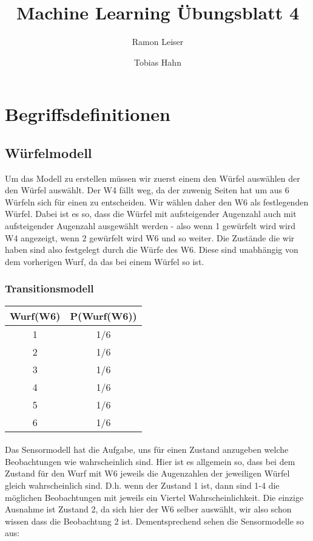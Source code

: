 \documentclass[a4paper]{article}
\title{Machine Learning Übungsblatt 4}
\author{Ramon Leiser\and Tobias Hahn}
\begin{document}
\maketitle
\newpage
\section{Begriffsdefinitionen}

\subsection{Würfelmodell}
Um das Modell zu erstellen müssen wir zuerst einem den Würfel auswählen der den Würfel auswählt. Der W4 fällt weg, da der zuwenig Seiten hat um aus 6 Würfeln sich für einen zu entscheiden. Wir wählen daher den W6 als festlegenden Würfel. Dabei ist es so, dass die Würfel mit aufsteigender Augenzahl auch mit aufsteigender Augenzahl ausgewählt werden - also wenn 1 gewürfelt wird wird W4 angezeigt, wenn 2 gewürfelt wird W6 und so weiter. Die Zustände die wir haben sind also festgelegt durch die Würfe des W6. Diese sind unabhängig von dem vorherigen Wurf, da das bei einem Würfel so ist.

\subsubsection{Transitionsmodell}
\begin{tabular}{|c|c|}
\hline
Wurf(W6) & P(Wurf(W6)) \\\hline
1 & 1/6 \\
2 & 1/6 \\
3 & 1/6 \\
4 & 1/6 \\
5 & 1/6 \\
6 & 1/6 \\\hline
\end{tabular}

\paragraph{}
Das Sensormodell hat die Aufgabe, uns für einen Zustand anzugeben welche Beobachtungen wie wahrscheinlich sind. Hier ist es allgemein so, dass bei dem Zustand für den Wurf mit W6 jeweils die Augenzahlen der jeweiligen Würfel gleich wahrscheinlich sind. D.h. wenn der Zustand 1 ist, dann sind 1-4 die möglichen Beobachtungen mit jeweils ein Viertel Wahrscheinlichkeit. Die einzige Ausnahme ist Zustand 2, da sich hier der W6 selber auswählt, wir also schon wissen dass die Beobachtung 2 ist. Dementsprechend sehen die Sensormodelle so aus:
\end{document}
